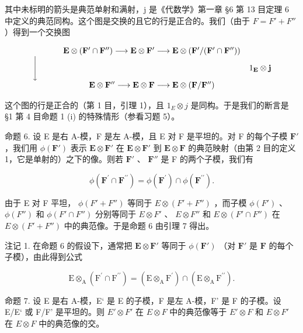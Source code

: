 其中未标明的箭头是典范单射和满射，j 是《代数学》第一章 §6 第 13 目定理 6 中定义的典范同构。这个图是交换的且它的行是正合的。我们（由于 \(F = F' + F''\) ）得到一个交换图

\[
\begin{array}{c} \mathbf {E} \otimes (\mathbf {F} ^ {\prime} \cap \mathbf {F} ^ {\prime \prime}) \longrightarrow \mathbf {E} \otimes \mathbf {F} ^ {\prime} \longrightarrow \mathbf {E} \otimes (\mathbf {F} ^ {\prime} / (\mathbf {F} ^ {\prime} \cap \mathbf {F} ^ {\prime \prime})) \\ \Biggl \downarrow \qquad \qquad \qquad \qquad \qquad \qquad \qquad \qquad \qquad \qquad \qquad \qquad \qquad 1 _ {\mathbf {E}} \otimes \mathbf {j} \\ \mathbf {E} \otimes \mathbf {F} ^ {\prime \prime} \longrightarrow \mathbf {E} \otimes \mathbf {F} \longrightarrow \mathbf {E} \otimes (\mathbf {F} / \mathbf {F} ^ {\prime \prime}) \end{array}
\]

这个图的行是正合的（第 1 目，引理 1），且 \(1_{E} \otimes j\) 是同构。于是我们的断言是 §1 第 4 目命题 1 (i) 的特殊情形（参看习题 5）。

命题 6. 设 E 是右 A-模，F 是左 A-模，且 E 对 F 是平坦的。对 F 的每个子模 \(\mathbf{F}'\) ，我们用 \(\phi(\mathbf{F}')\) 表示 \(\mathbf{E} \otimes \mathbf{F}'\) 在 \(\mathbf{E} \otimes \mathbf{F}'\) 到 \(\mathbf{E} \otimes \mathbf{F}\) 的典范映射（由第 2 目的定义 1，它是单射的）之下的像。则若 \(\mathbf{F}'\) 、 \(\mathbf{F}''\) 是 F 的两个子模，我们有

\[
\phi (\mathbf {F} ^ {\prime} \cap \mathbf {F} ^ {\prime \prime}) = \phi (\mathbf {F} ^ {\prime}) \cap \phi (\mathbf {F} ^ {\prime \prime}).
\]

由于 E 对 F 平坦， \(\phi(F' + F'')\) 等同于 \(E \otimes (F' + F'')\) ，而子模 \(\phi(F')\) 、 \(\phi(F'')\) 和 \(\phi(F' \cap F'')\) 分别等同于 \(E \otimes F'\) 、 \(E \otimes F''\) 和 \(E \otimes (F' \cap F'')\) 在 \(E \otimes (F' + F'')\) 中的典范像。于是命题 6 由引理 7 得出。

注记 1. 在命题 6 的假设下，通常把 \(\mathbf{E} \otimes \mathbf{F}'\) 等同于 \(\phi(\mathbf{F}')\) （对 \(\mathbf{F}'\) 是 \(\mathbf{F}\) 的每个子模），由此得到公式

\[
\mathrm{E} \otimes_ {\mathrm{A}} (\mathrm{F} ^ {\prime} \cap \mathrm{F} ^ {\prime \prime}) = (\mathrm{E} \otimes_ {\mathrm{A}} \mathrm{F} ^ {\prime}) \cap (\mathrm{E} \otimes_ {\mathrm{A}} \mathrm{F} ^ {\prime \prime}).
\]

命题 7. 设 E 是右 A-模，E‘ 是 E 的子模，F 是左 A-模，F’ 是 F 的子模。设 E/E‘ 或 F/F’ 是平坦的。则 \(E' \otimes F'\) 在 \(E \otimes F\) 中的典范像等于 \(E' \otimes F\) 和 \(E \otimes F'\) 在 \(E \otimes F\) 中的典范像的交。

